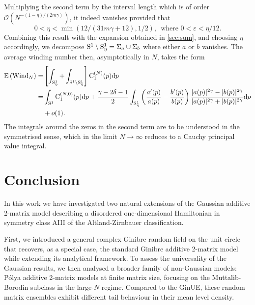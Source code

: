 \documentclass[pdflatex,sn-mathphys-num]{sn-jnl}
\theoremstyle{thmstyleone}
\numberwithin{equation}{section}
\newcommand{\Cc}{\mathrm{C}}
\begin{document}
Multiplying the second term by the interval length which is of order $\mathcal{O}(N^{-(1-\eta)/(2m\gamma)})$, it indeed vanishes provided that
\begin{equation}
    0<\eta<\min\left(12/(31m\gamma+12),1/2\right),\,\text{ where }0<\varepsilon<\eta/12.
\end{equation}
Combining this result with the expansion obtained in \autoref{sec:sum}, and choosing $\eta$ accordingly, we decompose ${\rm S}^{1}\setminus{\rm S}^{1}_{\eta}=\Sigma_a\cup\Sigma_b$ where either $a$ or $b$ vanishes. The average winding number then, asymptotically in $N$, takes the form
\begin{equation}
\begin{split}
 \mathbb{E}\left(\mathrm{Wind}_{N} \right)=&\left[\int_{{\rm S}^{1}_{\eta}}+\int_{{\rm S}^{1}\setminus{\rm S}^{1}_{\eta}}\right]\Cc_1^{(N)}(p)\mathrm{d}p\\
 =&\int_{{\rm S}^{1}} \Cc_1^{(N,0)}(p)\mathrm{d}p+\frac{\gamma-2\delta-1}{2}\int_{{\rm S}^{1}_{\eta}} \left(\frac{a'(p)}{a(p)}-\frac{b'(p)}{b(p)}\right)\frac{|a(p)|^{2\gamma}-|b(p)|^{2\gamma}}{|a(p)|^{2\gamma}+|b(p)|^{2\gamma}}\mathrm{d}p\\
 &+o(1).
 \end{split}
 \end{equation}
 The integrals around the zeros in the second term are to be understood in the symmetrised sense, which in the limit $N\to\infty$ reduces to a Cauchy principal value integral.

\section{Conclusion}\label{sec13}

In this work we have investigated two natural extensions of the Gaussian additive 2-matrix model describing a disordered one-dimensional Hamiltonian in symmetry class AIII of the Altland-Zirnbauer classification.

First, we introduced a general complex Ginibre random field on the unit circle that recovers, as a special case, the standard Ginibre additive 2-matrix model while extending its analytical framework. To assess the universality of the Gaussian results, we then analysed a broader family of non-Gaussian models: P\'olya additive 2-matrix models at finite matrix size, focusing on the Muttalib-Borodin subclass in the large-$N$ regime. Compared to the GinUE, these random matrix ensembles exhibit different tail behaviour in their mean level density.
\end{document}
